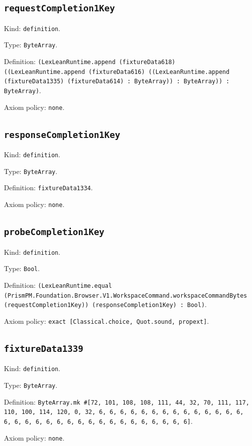 \documentclass[11pt]{article}
\begin{document}
\subsection*{\texttt{requestCompletion1Key}}
\noindent Kind: \texttt{definition}.\par
\noindent Type: \texttt{ByteArray}.\par
\noindent Definition: \texttt{(LexLeanRuntime.append (fixtureData618) ((LexLeanRuntime.append (fixtureData616) ((LexLeanRuntime.append (fixtureData1335) (fixtureData614) : ByteArray)) : ByteArray)) : ByteArray)}.\par
\noindent Axiom policy: \texttt{none}.\par
\subsection*{\texttt{responseCompletion1Key}}
\noindent Kind: \texttt{definition}.\par
\noindent Type: \texttt{ByteArray}.\par
\noindent Definition: \texttt{fixtureData1334}.\par
\noindent Axiom policy: \texttt{none}.\par
\subsection*{\texttt{probeCompletion1Key}}
\noindent Kind: \texttt{definition}.\par
\noindent Type: \texttt{Bool}.\par
\noindent Definition: \texttt{(LexLeanRuntime.equal (PrismPM.Foundation.Browser.V1.WorkspaceCommand.workspaceCommandBytes (requestCompletion1Key)) (responseCompletion1Key) : Bool)}.\par
\noindent Axiom policy: \texttt{exact [Classical.choice, Quot.sound, propext]}.\par
\subsection*{\texttt{fixtureData1339}}
\noindent Kind: \texttt{definition}.\par
\noindent Type: \texttt{ByteArray}.\par
\noindent Definition: \texttt{ByteArray.mk \#[72, 101, 108, 108, 111, 44, 32, 70, 111, 117, 110, 100, 114, 120, 0, 32, 6, 6, 6, 6, 6, 6, 6, 6, 6, 6, 6, 6, 6, 6, 6, 6, 6, 6, 6, 6, 6, 6, 6, 6, 6, 6, 6, 6, 6, 6, 6, 6]}.\par
\noindent Axiom policy: \texttt{none}.\par
\end{document}
